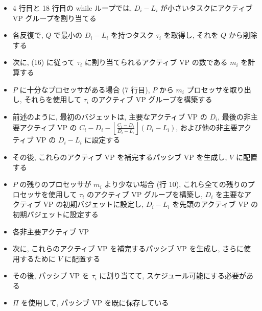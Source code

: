 \begin{frame}{}
    \begin{itemize}
        \item 4 行目と 18 行目の while ループでは, $D_{i}-L_{i}$ が小さいタスクにアクティブ VP グループを割り当てる
\item 各反復で, $Q$ で最小の $D_{i}-L_{i}$ を持つタスク $\tau_{i}$ を取得し, それを $Q$ から削除する
\item 次に, (16) に従って $\tau_{i}$ に割り当てられるアクティブ VP の数である $m_{i}$ を計算する
    \end{itemize}
\end{frame}

\begin{frame}{}
    \begin{itemize}
        \item $P$ に十分なプロセッサがある場合 (7 行目), $P$ から $m_{i}$ プロセッサを取り出し, それらを使用して $\tau_{i}$ のアクティブ VP グループを構築する
\item 前述のように, 最初のバジェットは, 主要なアクティブ VP の $D_{i}$, 最後の非主要アクティブ VP の $C_{i}-D_{i}-\left\lfloor\frac{C_{i}-D_{i}}{D_{i}-L_{i}}\right\rfloor\left(D_{i}-L_{i}\right)$, および他の非主要アクティブ VP の $D_{i}-L_{i}$ に設定する
\item その後, これらのアクティブ VP を補完するパッシブ VP を生成し, $V$ に配置する
    \end{itemize}
\end{frame}

\begin{frame}{}
    \begin{itemize}
        \item $P$ の残りのプロセッサが $m_{i}$ より少ない場合 (行 10), これら全ての残りのプロセッサを使用して $\tau_{i}$ のアクティブ VP グループを構築し, $D_{i}$ を主要なアクティブ VP の初期バジェットに設定し, $D_{i}-L_{i}$ を先頭のアクティブ VP の初期バジェットに設定する
\item 各非主要アクティブ VP
\item 次に, これらのアクティブ VP を補完するパッシブ VP を生成し, さらに使用するために $V$ に配置する
\item その後, パッシブ VP を $\tau_{i}$ に割り当てて, スケジュール可能にする必要がある
\item $\Pi$ を使用して, パッシブ VP を既に保存している
    \end{itemize}
\end{frame}

